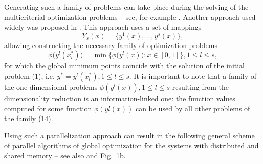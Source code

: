 \documentclass[12pt]{amsart}
\begin{document}
Generating such a family of problems can take place during the solving of the multicriterial optimization problems -- see, for example \cite{Gergel3, Gergel4}. Another approach used widely was proposed in \cite{Strongin1, Strongin2, Strongin5, Gergel1}. This approach uses a set of mappings
\begin{equation}
Y_s(x) = \{ y^1(x), \dots , y^s(x) \},
\end{equation}
allowing constructing the necessary family of optimization problems 
\begin{equation}
\phi\bigl(y^l(x^\ast_l)\bigr) = \min \bigl\{\phi\bigl(y^l(x)\bigl): x \in [0, 1] \bigl\}, 1 \leq l \leq s,
\end{equation}
for which the global minimum points coincide with the solution of the initial problem (1), i.e. $ y^\ast = y^l(x_l^\ast), 1 \leq l \leq s$. It is important to note that a family of the one-dimensional problems $\phi(y^l(x)), 1 \leq l \leq s$ resulting from the dimensionality reduction is an information-linked one: the function values computed for some function $\phi(yl(x))$ can be used by all other problems of the family (14).

Using such a parallelization approach can result in the following general scheme of parallel algorithms of global optimization for the systems with distributed and shared memory -- see also \cite{Gergel1} and Fig.~1b.
\end{document}
